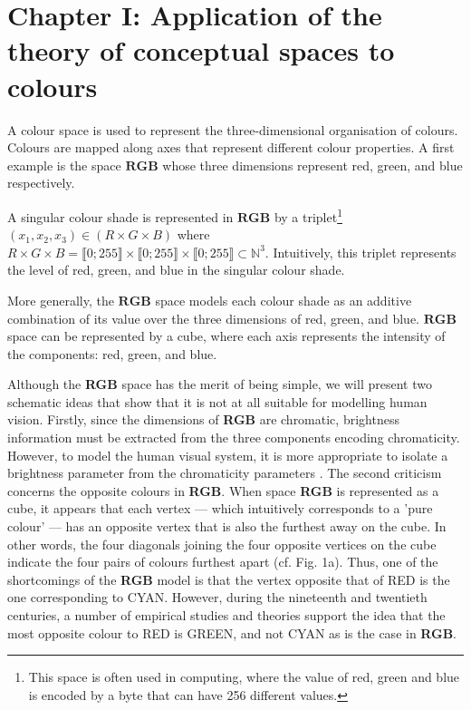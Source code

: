 \documentclass{article}
\begin{document}
\section*{Chapter I: Application of the theory of conceptual spaces to colours}

\hspace*{\parindent}A colour space is used to represent the three-dimensional organisation of colours. Colours are mapped along axes that represent different colour properties. A first example is the space $\mathbf{RGB}$ whose three dimensions represent red, green, and blue respectively.

A singular colour shade is represented in $\mathbf{RGB}$ by a triplet\footnote{This space is often used in computing, where the value of red, green and blue is encoded by a byte that can have 256 different values.} $\left(x_1,x_2,x_3\right) \in \left(R \times G \times B\right)$ where $R \times G \times B = \llbracket 0 ; 255 \rrbracket \times \llbracket 0 ; 255 \rrbracket \times \llbracket 0 ; 255 \rrbracket \subset \mathbb{N}^3$. Intuitively, this triplet represents the level of red, green, and blue in the singular colour shade.

More generally, the $\mathbf{RGB}$ space models each colour shade as an additive combination of its value over the three dimensions of red, green, and blue. $\mathbf{RGB}$ space can be represented by a cube, where each axis represents the intensity of the components: red, green, and blue.

Although the \textbf{RGB} space has the merit of being simple, we will present two schematic ideas that show that it is not at all suitable for modelling human vision. Firstly, since the dimensions of \textbf{RGB} are chromatic, brightness information must be extracted from the three components encoding chromaticity. However, to model the human visual system, it is more appropriate to isolate a brightness parameter from the chromaticity parameters \cite[p.78]{fairchild2013}. The second criticism concerns the opposite colours in \textbf{RGB}. When space \textbf{RGB} is represented as a cube, it appears that each vertex — which intuitively corresponds to a 'pure colour' — has an opposite vertex that is also the furthest away on the cube. In other words, the four diagonals joining the four opposite vertices on the cube indicate the four pairs of colours furthest apart (cf. Fig. 1a). Thus, one of the shortcomings of the \textbf{RGB} model is that the vertex opposite that of RED is the one corresponding to CYAN. However, during the nineteenth and twentieth centuries, a number of empirical studies and theories support the idea that the most opposite colour to RED is GREEN, and not CYAN as is the case in \textbf{RGB}.
\end{document}
